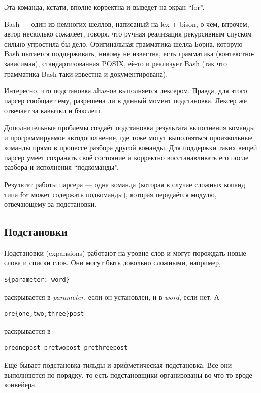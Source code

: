 \documentclass[a5paper]{article}
\begin{document}
Эта команда, кстати, вполне корректна и выведет на экран ``for''.

Bash --- один из немногих шеллов, написаный на lex + bison, о чём, впрочем, автор несколько сожалеет, говоря, что ручная реализация рекурсивным спуском сильно упростила бы дело. Оригинальная грамматика шелла Борна, которую Bash пытается поддерживать, никому не известна, есть грамматика (контекстно-зависимая), стандартизованная POSIX, её-то и реализует Bash (так что грамматика Bash таки известна и документирована).

Интересно, что подстановка alias-ов выполняется лексером. Правда, для этого парсер сообщает ему, разрешена ли в данный момент подстановка. Лексер же отвечает за кавычки и бэкслеш.

Дополнительные проблемы создаёт подстановка результата выполнения команды и программируемое автодополнение, где тоже могут выполняться произвольные команды прямо в процессе разбора другой команды. Для поддержки таких вещей парсер умеет сохранять своё состояние и корректно восстанавливать его после разбора и исполнения ``подкоманды''.

Результат работы парсера --- одна команда (которая в случае сложных копанд типа for может содержать подкоманды), которая передаётся модулю, отвечающему за подстановки.

\subsection{Подстановки}

Подстановки (expansions) работают на уровне слов и могут порождать новые слова и списки слов. Они могут быть довольно сложными, например,

\begin{verbatim}
${parameter:-word}
\end{verbatim}

раскрывается в \textit{parameter}, если он установлен, и в \textit{word}, если нет. А

\begin{verbatim}
pre{one,two,three}post
\end{verbatim}

раскрывается в 

\begin{verbatim}
preonepost pretwopost prethreepost
\end{verbatim}

Ещё бывает подстановка тильды и арифметическая подстановка. Все они выполняются по порядку, то есть подстановщики организованы во что-то вроде конвейера.
\end{document}
